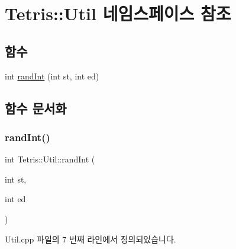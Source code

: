 \hypertarget{namespace_tetris_1_1_util}{}\section{Tetris\+:\+:Util 네임스페이스 참조}
\label{namespace_tetris_1_1_util}
\subsection*{함수}
\begin{DoxyCompactItemize}
\item 
int \hyperlink{namespace_tetris_1_1_util_aa590e9fd847ac6e0c9bc6bf464b5a74b}{rand\+Int} (int st, int ed)
\end{DoxyCompactItemize}


\subsection{함수 문서화}
\mbox{\label{namespace_tetris_1_1_util_aa590e9fd847ac6e0c9bc6bf464b5a74b}} 
\subsubsection{\texorpdfstring{rand\+Int()}{randInt()}}
{\footnotesize\ttfamily int Tetris\+::\+Util\+::rand\+Int (\begin{DoxyParamCaption}\item[{int}]{st,  }\item[{int}]{ed }\end{DoxyParamCaption})}



Util.\+cpp 파일의 7 번째 라인에서 정의되었습니다.


